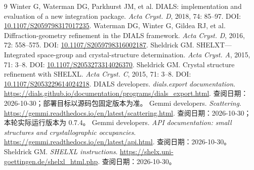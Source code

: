 \documentclass[UTF8,11pt,a4paper,fontset=fandol]{ctexart}
\begin{document}
\clearpage
\begin{thebibliography}{9}
\small
{} Winter G, Waterman DG, Parkhurst JM, et al. DIALS: implementation and evaluation of a new integration package. \textit{Acta Cryst. D}, 2018, 74: 85--97. DOI: \href{https://doi.org/10.1107/S2059798317017235}{10.1107/S2059798317017235}.
 Waterman DG, Winter G, Gildea RJ, et al. Diffraction-geometry refinement in the DIALS framework. \textit{Acta Cryst. D}, 2016, 72: 558--575. DOI: \href{https://doi.org/10.1107/S2059798316002187}{10.1107/S2059798316002187}.
 Sheldrick GM. SHELXT---Integrated space-group and crystal-structure determination. \textit{Acta Cryst. A}, 2015, 71: 3--8. DOI: \href{https://doi.org/10.1107/S2053273314026370}{10.1107/S2053273314026370}.
 Sheldrick GM. Crystal structure refinement with SHELXL. \textit{Acta Cryst. C}, 2015, 71: 3--8. DOI: \href{https://doi.org/10.1107/S2053229614024218}{10.1107/S2053229614024218}.
 DIALS developers. \textit{dials.export documentation}. \url{https://dials.github.io/documentation/programs/dials_export.html}. 查阅日期：2026-10-30；部署目标以源码包固定版本为准。
 Gemmi developers. \textit{Scattering}. \url{https://gemmi.readthedocs.io/en/latest/scattering.html}. 查阅日期：2026-10-30；本轮实际运行版本为 0.7.4。
 Gemmi developers. \textit{API documentation: small structures and crystallographic occupancies}. \url{https://gemmi.readthedocs.io/en/latest/api.html}. 查阅日期：2026-10-30。
 Sheldrick GM. \textit{SHELXL instructions}. \url{https://shelx.uni-goettingen.de/shelxl_html.php}. 查阅日期：2026-10-30。
\end{thebibliography}
\end{document}

